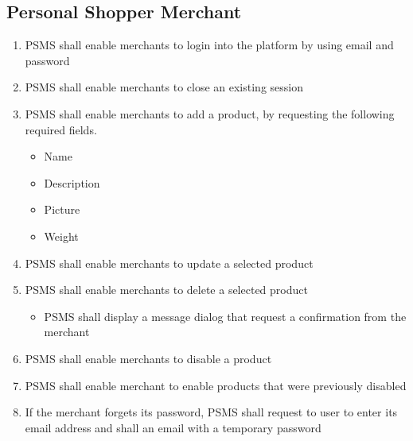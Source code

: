 \subsection{Personal Shopper Merchant}
\begin{enumerate}[resume, label=SY-\arabic*]
    \item PSMS shall enable merchants to login into the platform by 
    using email and password
    \item PSMS shall enable merchants to close an existing session
    \item PSMS shall enable merchants to add a product, by requesting the 
    following required fields.
    \begin{itemize}
        \item Name
        \item Description
        \item Picture
        \item Weight
    \end{itemize}
    \item PSMS shall enable merchants to update a selected product
    \item PSMS shall enable merchants to delete a selected product
    \begin{itemize}
        \item PSMS shall display a message dialog that request a confirmation 
        from the merchant
    \end{itemize}
    \item PSMS shall enable merchants to disable a product
    \item PSMS shall enable merchant to enable products that were 
    previously disabled
    \item If the merchant forgets its password, PSMS shall request to user 
    to enter its email address and shall an email with a temporary password
\end{enumerate}
\pagebreak
